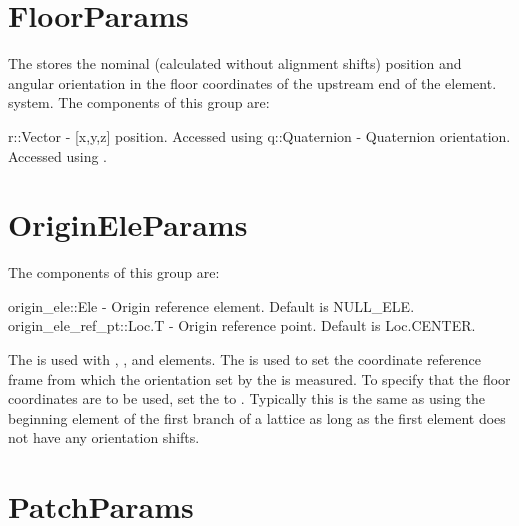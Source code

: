\section{FloorParams}
\label{s:orientation.g}

The  stores the nominal (calculated without alignment shifts) 
position and angular orientation in the floor coordinates of the upstream end of the element.
system. The components of this group are:
\begin{example}
  r::Vector          - [x,y,z] position. Accessed using 
  q::Quaternion      - Quaternion orientation. Accessed using .
\end{example}




\section{OriginEleParams}
\label{s:origin.ele.g}

The components of this group are:
\begin{example}
  origin_ele::Ele           - Origin reference element. Default is NULL_ELE.
  origin_ele_ref_pt::Loc.T  - Origin reference point. Default is Loc.CENTER. 
\end{example}

The  is used with , , and  elements.
The  is used to set the coordinate reference frame from which 
the orientation set by the  is measured. To specify that the floor coordinates are
to be used, set the  to . Typically this is the same as using the
beginning element of the first branch of a lattice as long as the first element does not have
any orientation shifts.


\section{PatchParams}
\label{s:patch.g}

